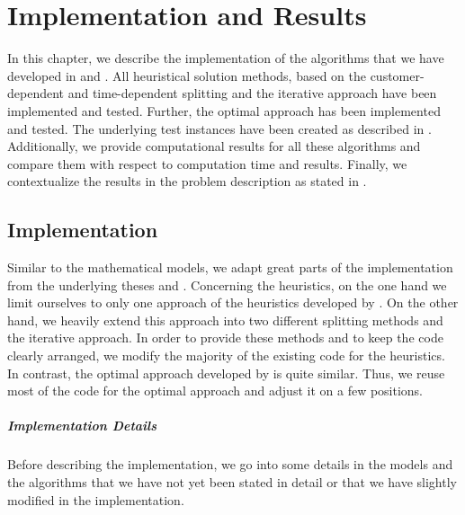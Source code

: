 \chapter{Implementation and Results}
\label{ch:implementation_results}

In this chapter, we describe the implementation of the algorithms that we have developed in  and . All heuristical solution methods, based on the customer-dependent and time-dependent splitting and the iterative approach have been implemented and tested. Further, the optimal approach has been implemented and tested. The underlying test instances have been created as described in . Additionally, we provide computational results for all these algorithms and compare them with respect to computation time and results. Finally, we contextualize the results in the problem description as stated in .


\section{Implementation}
\label{sec:implementation}

Similar to the mathematical models, we adapt great parts of the implementation from the underlying theses \cite{Kaiser} and \cite{Knoll}. Concerning the heuristics, on the one hand we limit ourselves to only one approach of the heuristics developed by \cite{Knoll}. On the other hand, we heavily extend this approach into two different splitting methods and the iterative approach. In order to provide these methods and to keep the code clearly arranged, we modify the majority of the existing code for the heuristics. In contrast, the optimal approach developed by \cite{Kaiser} is quite similar. Thus, we reuse most of the code for the optimal approach and adjust it on a few positions. 

\paragraph{Implementation Details} \parfill

Before describing the implementation, we go into some details in the models and the algorithms that we have not yet been stated in detail or that we have slightly modified in the implementation.

